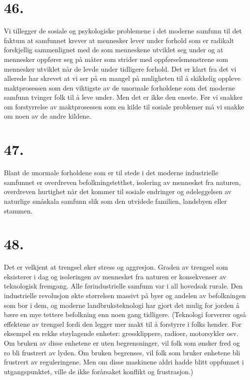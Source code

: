 \documentclass[oneside]{book}
\begin{document}
\section*{46.}
Vi tillegger de sosiale og psykologiske problemene i det moderne samfunn til
det faktum at samfunnet krever at mennesker lever under forhold som er radikalt
forskjellig sammenlignet med de som menneskene utviklet seg under og at
mennesker oppfører seg på måter som strider med oppførselsmønstrene som
mennesker utviklet når de levde under tidligere forhold. Det er klart fra det
vi allerede har skrevet at vi ser på en mangel på muligheten til å skikkelig
oppleve maktprosessen som den viktigste av de unormale forholdene som det
moderne samfunn tvinger folk til å leve under. Men det er ikke den eneste. Før
vi snakker om forstyrrelse av maktprosessen som en kilde til sosiale problemer
må vi snakke om noen av de andre kildene. 

\section*{47.}
Blant de unormale forholdene som er til stede i det moderne industrielle
samfunnet er overdreven befolkningstetthet, isolering av mennesket fra naturen,
overdreven hurtighet når det kommer til sosiale endringer og ødeleggelsen av
naturlige småskala samfunn slik som den utvidede familien, landsbyen eller
stammen. 

\section*{48.}
Det er velkjent at trengsel øker stress og aggresjon. Graden av trengsel som
eksisterer i dag og isoleringen av mennesket fra naturen er konsekvenser av
teknologisk fremgang. Alle førindustrielle samfunn var i all hovedsak rurale.
Den industrielle revolusjon økte størrelsen massivt på byer og andelen av
befolkningen som bor i dem, og moderne landbruksteknologi har gjort det mulig
for jorden å bære en mye tettere befolkning enn noen gang tidligere. (Teknologi
forverrer også effektene av trengsel fordi den legger mer makt til å forstyrre
i folks hender. For eksempel en rekke støylagende enheter: gressklippere,
radioer, motorsykler osv. Om bruken av disse enhetene er uten begrensninger,
vil folk som ønsker fred og ro bli frustrert av lyden. Om bruken begrenses, vil
folk som bruker enhetene bli frustrert av reguleringene. Men om disse maskinene
aldri hadde blitt oppfunnet i utgangspunktet, ville de ikke forårsaket konflikt
og frustrasjon.)
\end{document}
